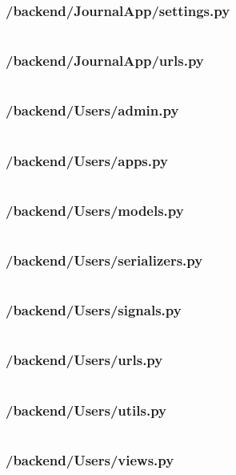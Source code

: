 
\subsubsection{/backend/JournalApp/settings.py}
\inputminted{python3}{SourceCode/backend/JournalApp/settings.py}
\subsubsection{/backend/JournalApp/urls.py}
\inputminted{python3}{SourceCode/backend/JournalApp/urls.py}
\subsubsection{/backend/Users/admin.py}
\inputminted{python3}{SourceCode/backend/Users/admin.py}
\subsubsection{/backend/Users/apps.py}
\inputminted{python3}{SourceCode/backend/Users/apps.py}
\subsubsection{/backend/Users/models.py}
\inputminted{python3}{SourceCode/backend/Users/models.py}
\subsubsection{/backend/Users/serializers.py}
\inputminted{python3}{SourceCode/backend/Users/serializers.py}
\subsubsection{/backend/Users/signals.py}
\inputminted{python3}{SourceCode/backend/Users/signals.py}
\subsubsection{/backend/Users/urls.py}
\inputminted{python3}{SourceCode/backend/Users/urls.py}
\subsubsection{/backend/Users/utils.py}
\inputminted{python3}{SourceCode/backend/Users/utils.py}
\subsubsection{/backend/Users/views.py}
\inputminted{python3}{SourceCode/backend/Users/views.py}

